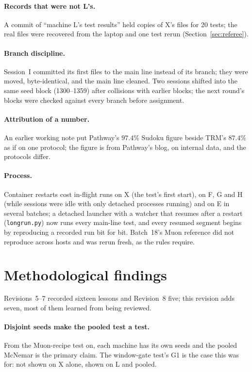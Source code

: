 \documentclass[11pt]{article}
\begin{document}
\paragraph{Records that were not L's.} A commit of ``machine L's test results'' held copies of X's files for 20 tests; the real files were recovered from the laptop and one test rerun (Section~\ref{sec:referee}).

\paragraph{Branch discipline.} Session~I committed its first files to the main line instead of its branch; they were moved, byte-identical, and the main line cleaned. Two sessions shifted into the same seed block (1300--1359) after collisions with earlier blocks; the next round's blocks were checked against every branch before assignment.

\paragraph{Attribution of a number.} An earlier working note put Pathway's $97.4\%$ Sudoku figure beside TRM's $87.4\%$ as if on one protocol; the figure is from Pathway's blog, on internal data, and the protocols differ.

\paragraph{Process.} Container restarts cost in-flight runs on X (the test's first start), on F, G and H (while sessions were idle with only detached processes running) and on E in several batches; a detached launcher with a watcher that resumes after a restart (\texttt{longrun.py}) now runs every main-line test, and every resumed segment begins by reproducing a recorded run bit for bit. Batch~18's Muon reference did not reproduce across hosts and was rerun fresh, as the rules require.

\section{Methodological findings}
\label{sec:method}

Revisions~5--7 recorded sixteen lessons and Revision~8 five; this revision adds seven, most of them learned from being reviewed.

\paragraph{Disjoint seeds make the pooled test a test.} From the Muon-recipe test on, each machine has its own seeds and the pooled McNemar is the primary claim. The window-gate test's G1 is the case this was for: not shown on X alone, shown on L and pooled.
\end{document}
